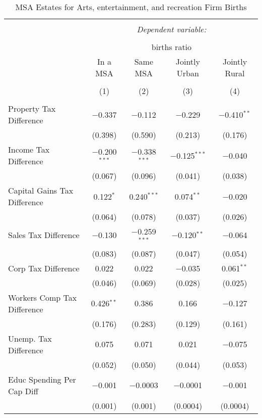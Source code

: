 
\begin{table}[!htbp] \centering 
  \caption{MSA Estates for  Arts, entertainment, and recreation Firm Births} 
  \label{} 
\begin{tabular}{@{\extracolsep{5pt}}lcccc} 
\\[-1.8ex]\hline 
\hline \\[-1.8ex] 
 & \multicolumn{4}{c}{\textit{Dependent variable:}} \\ 
\cline{2-5} 
\\[-1.8ex] & \multicolumn{4}{c}{births ratio} \\ 
 & In a MSA & Same MSA & Jointly Urban & Jointly Rural \\ 
\\[-1.8ex] & (1) & (2) & (3) & (4)\\ 
\hline \\[-1.8ex] 
 Property Tax Difference & $-$0.337 & $-$0.112 & $-$0.229 & $-$0.410$^{**}$ \\ 
  & (0.398) & (0.590) & (0.213) & (0.176) \\ 
  Income Tax Difference & $-$0.200$^{***}$ & $-$0.338$^{***}$ & $-$0.125$^{***}$ & $-$0.040 \\ 
  & (0.067) & (0.096) & (0.041) & (0.038) \\ 
  Capital Gains Tax Difference & 0.122$^{*}$ & 0.240$^{***}$ & 0.074$^{**}$ & $-$0.020 \\ 
  & (0.064) & (0.078) & (0.037) & (0.026) \\ 
  Sales Tax Difference & $-$0.130 & $-$0.259$^{***}$ & $-$0.120$^{**}$ & $-$0.064 \\ 
  & (0.083) & (0.087) & (0.047) & (0.054) \\ 
  Corp Tax Difference & 0.022 & 0.022 & $-$0.035 & 0.061$^{**}$ \\ 
  & (0.046) & (0.069) & (0.028) & (0.025) \\ 
  Workers Comp Tax Difference & 0.426$^{**}$ & 0.386 & 0.166 & $-$0.127 \\ 
  & (0.176) & (0.283) & (0.129) & (0.161) \\ 
  Unemp. Tax Difference & 0.075 & 0.071 & 0.021 & $-$0.075 \\ 
  & (0.052) & (0.050) & (0.044) & (0.053) \\ 
  Educ Spending Per Cap Diff & $-$0.001 & $-$0.0003 & $-$0.0001 & $-$0.001 \\ 
  & (0.001) & (0.001) & (0.0004) & (0.0004) \\ 

\end{tabular}
\end{table}
